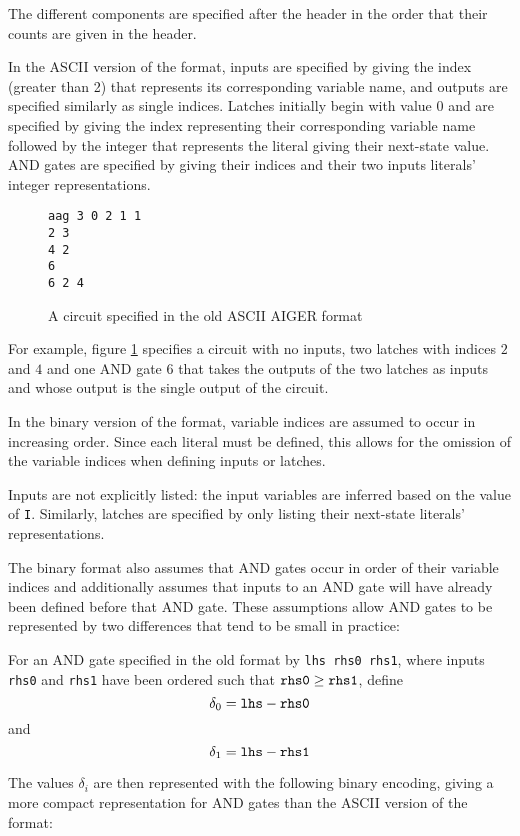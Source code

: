 \documentclass[12pt,a4paper,twoside,openright]{report}
\begin{document}
The different components are specified after the header
in the order that their counts are given in the header.

In the ASCII version of the format, inputs are specified by giving the
index (greater than 2) that represents its corresponding variable name,
and outputs are specified similarly as single indices.
Latches initially begin with value 0 and are specified by giving the
index representing
their corresponding variable name followed by the integer that represents
the literal giving their next-state value.
AND gates are specified by giving their indices and their two inputs
literals' integer representations.

\begin{figure}[h]
\centering
\begin{verbatim}
aag 3 0 2 1 1
2 3
4 2
6
6 2 4
\end{verbatim}
\caption{
A circuit specified in the old ASCII AIGER format
}
\label{aagCircuit}
\end{figure}

For example, figure \ref{aagCircuit} specifies a circuit with
no inputs, two latches with indices $2$ and $4$ and one AND gate
$6$ that takes the outputs of the two latches as inputs and whose
output is the single output of the circuit.

In the binary version of the format, variable indices are assumed to
occur in increasing order. Since each literal must be defined, this allows
for the omission of the variable indices when defining inputs or latches.

Inputs are not explicitly listed: the input variables are inferred based on
the value of \verb,I,.
Similarly, latches are specified by only listing their next-state literals'
representations.

The binary format also assumes that AND gates occur in order of their
variable indices and additionally assumes that inputs to an AND gate will
have already been defined before that AND gate.
These assumptions allow AND gates to be represented by two differences
that tend to be small in practice:

For an AND gate specified in the old format by \verb,lhs rhs0 rhs1,,
where inputs \verb,rhs0, and \verb,rhs1, have been ordered such that
$\verb,rhs0, \geq \verb,rhs1,$, define
$$\delta_0 = \verb,lhs, - \verb,rhs0,$$
and
$$\delta_1 = \verb,lhs, - \verb,rhs1,$$

The values $\delta_i$ are then represented with the following binary
encoding, giving a more compact representation for AND gates than
the ASCII version of the format:
\end{document}
